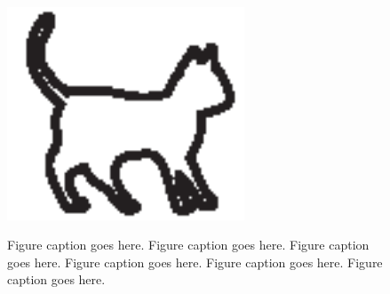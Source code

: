 \begin{figure}[htb]
\includegraphics[width=200pt, height=200pt]{Chapters/chapter1/figures/cat.eps}
\caption[Short figure caption]{Figure caption goes here. Figure caption goes here.
Figure caption goes here. Figure caption goes here. Figure caption goes here.
Figure caption goes here.}
\end{figure}





